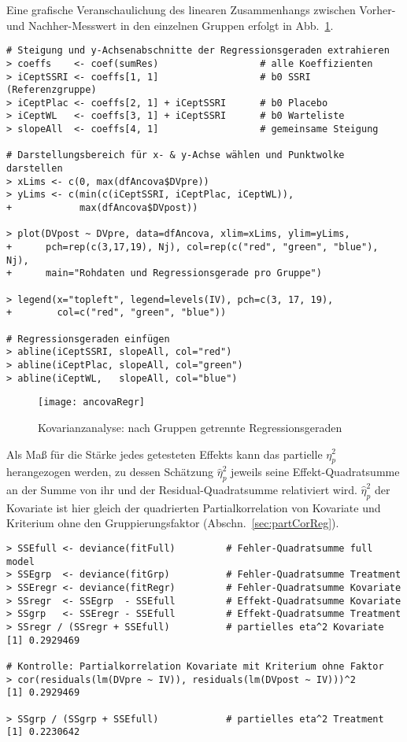Eine grafische Veranschaulichung des linearen Zusammenhangs zwischen Vorher- und Nachher-Messwert in den einzelnen Gruppen erfolgt in Abb.\ \ref{fig:ancovaRegr}.
\begin{lstlisting}
# Steigung und y-Achsenabschnitte der Regressionsgeraden extrahieren
> coeffs    <- coef(sumRes)                  # alle Koeffizienten
> iCeptSSRI <- coeffs[1, 1]                  # b0 SSRI (Referenzgruppe)
> iCeptPlac <- coeffs[2, 1] + iCeptSSRI      # b0 Placebo
> iCeptWL   <- coeffs[3, 1] + iCeptSSRI      # b0 Warteliste
> slopeAll  <- coeffs[4, 1]                  # gemeinsame Steigung

# Darstellungsbereich für x- & y-Achse wählen und Punktwolke darstellen
> xLims <- c(0, max(dfAncova$DVpre))
> yLims <- c(min(c(iCeptSSRI, iCeptPlac, iCeptWL)),
+            max(dfAncova$DVpost))

> plot(DVpost ~ DVpre, data=dfAncova, xlim=xLims, ylim=yLims,
+      pch=rep(c(3,17,19), Nj), col=rep(c("red", "green", "blue"), Nj),
+      main="Rohdaten und Regressionsgerade pro Gruppe")

> legend(x="topleft", legend=levels(IV), pch=c(3, 17, 19),
+        col=c("red", "green", "blue"))

# Regressionsgeraden einfügen
> abline(iCeptSSRI, slopeAll, col="red")
> abline(iCeptPlac, slopeAll, col="green")
> abline(iCeptWL,   slopeAll, col="blue")
\end{lstlisting}

\begin{figure}[ht]
\centering
\texttt{[image: ancovaRegr]}
\vspace*{-0.5em}
\caption{Kovarianzanalyse: nach Gruppen getrennte Regressionsgeraden}
\label{fig:ancovaRegr}
\end{figure}

Als Maß für die Stärke jedes getesteten Effekts kann das partielle $\eta_{p}^{2}$ herangezogen werden, zu dessen Schätzung $\hat{\eta}_{p}^{2}$ jeweils seine Effekt-Quadratsumme an der Summe von ihr und der Residual-Quadratsumme relativiert wird. $\hat{\eta}_{p}^{2}$ der Kovariate ist hier gleich der quadrierten Partialkorrelation von Kovariate und Kriterium ohne den Gruppierungsfaktor (Abschn.\ \ref{sec:partCorReg}).
\begin{lstlisting}
> SSEfull <- deviance(fitFull)         # Fehler-Quadratsumme full model
> SSEgrp  <- deviance(fitGrp)          # Fehler-Quadratsumme Treatment
> SSEregr <- deviance(fitRegr)         # Fehler-Quadratsumme Kovariate
> SSregr  <- SSEgrp  - SSEfull         # Effekt-Quadratsumme Kovariate
> SSgrp   <- SSEregr - SSEfull         # Effekt-Quadratsumme Treatment
> SSregr / (SSregr + SSEfull)          # partielles eta^2 Kovariate
[1] 0.2929469

# Kontrolle: Partialkorrelation Kovariate mit Kriterium ohne Faktor
> cor(residuals(lm(DVpre ~ IV)), residuals(lm(DVpost ~ IV)))^2
[1] 0.2929469

> SSgrp / (SSgrp + SSEfull)            # partielles eta^2 Treatment
[1] 0.2230642
\end{lstlisting}

